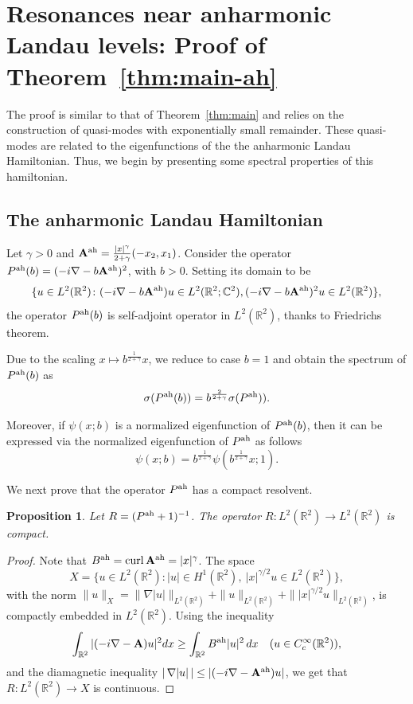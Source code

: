 \documentclass[11pt]{amsart}
\newtheorem{proposition}[theorem]{Proposition}
\theoremstyle{remark}
\newcommand{\bA}{\mathbf{A}}
\newcommand{\R}{\mathbb{R}}
\DeclareMathOperator{\Curl}{curl}
\numberwithin{equation}{section}
\begin{document}
\section{Resonances near anharmonic Landau levels: Proof of Theorem~\ref{thm:main-ah}}\label{sec:ah}

The proof  is similar to that of Theorem~\ref{thm:main} and relies on the construction of quasi-modes with exponentially small remainder. These quasi-modes are related to the eigenfunctions of the the anharmonic Landau Hamiltonian. Thus, we begin by presenting some spectral properties of this hamiltonian.

\subsection{The anharmonic Landau Hamiltonian}

Let $\gamma>0$ and $\bA^{\rm ah}=\frac{|x|^{\gamma}}{2+\gamma}(-x_2,x_1)$. Consider the operator $P^{\rm ah}(b)=(-i\nabla-b\bA^{\rm ah})^2$, with $b>0$. Setting its domain to be
\[\{u\in L^2(\R^2)\colon (-i\nabla-b\bA^{\rm ah})u\in L^2(\R^2;\mathbb C^2),(-i\nabla-b\bA^{\rm ah})^2u\in L^2(\R^2)\},\]
the operator $P^{\rm ah}(b)$ is self-adjoint operator in $L^2(\R^2)$, thanks to Friedrichs
 theorem. 




Due to the scaling $x\mapsto b^{\frac{1}{2+\gamma}}x$, we reduce to case $b=1$ and obtain the spectrum of $P^{\rm ah}(b)$ as
\[\sigma(P^{\rm ah}(b))=b^{\frac{2}{2+\gamma}}\sigma(P^{\rm ah})).\]

Moreover, if $\psi(x;b)$ is a normalized eigenfunction of $P^{\rm ah}(b)$, then it can be expressed via the normalized eigenfunction of $P^{\rm ah}$ as follows
\[\psi(x;b)=b^{\frac{1}{2+\gamma}}\psi(b^{\frac{1}{2+\gamma}}x ;1).\]

We next prove that the operator $P^{\rm ah}$ has a compact  resolvent.

\begin{proposition}\label{prop:comp-res}
Let $R=(P^{\rm ah}+1)^{-1}$. The operator $R:L^2(\R^2)\to L^2(\R^2)$ is compact.
\end{proposition}
\begin{proof}
Note that $B^{\rm ah}=\Curl\bA^{\rm ah}=|x|^\gamma$. The space
\[X=\{u\in L^2(\R^2)\colon |u|\in H^1(\R^2),~|x|^{\gamma/2}u\in L^2(\R^2)\}, \]
with the norm $\|u\|_X=\|\nabla|u|\|_{L^2(\R^2)}+\|u\|_{L^2(\R^2)}+\||x|^{\gamma/2}u\|_{L^2(\R^2)}$, is compactly embedded in $L^2(\R^2)$. Using the inequality
\[\int_{\R^2}|(-i\nabla-\bA)u|^2dx\geq \int_{\R^2}B^{\rm ah}|u|^2\,dx\quad (u\in C_c^\infty(\R^2)), \]
and the diamagnetic inequality $|\,\nabla|u|\,|\leq |(-i\nabla-\bA^{\rm ah})u|$, we get that $R:L^2(\R^2)\to X$ is continuous.
\end{proof}
\end{document}

